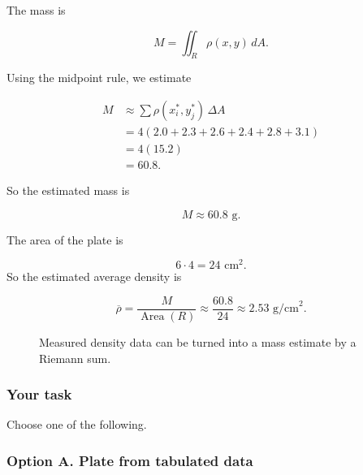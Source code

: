 The mass is

\[
    M=\iint_R \rho(x,y)\,dA.
\]

Using the midpoint rule, we estimate

\[
\begin{aligned}
M
&\approx
\sum \rho(x_i^*,y_j^*)\,\Delta A\\
&=
4(2.0+2.3+2.6+2.4+2.8+3.1)\\
&=
4(15.2)\\
&=
60.8.
\end{aligned}
\]

So the estimated mass is

\[
\boxed{
    M\approx 60.8\text{ g}.
}
\]

The area of the plate is

\[
    6\cdot4=24\text{ cm}^2.
\]
So the estimated average density is

\[
\boxed{
    \overline{\rho}
    =
    \frac{M}{\operatorname{Area}(R)}
    \approx
    \frac{60.8}{24}
    \approx
    2.53\text{ g/cm}^2.
}
\]

\begin{figure}[h]
\centering
{}
\caption{Measured density data can be turned into a mass estimate by a Riemann sum.}
\end{figure}

\subsubsection*{Your task}

Choose one of the following.

\subsubsection*{Option A. Plate from tabulated data}

